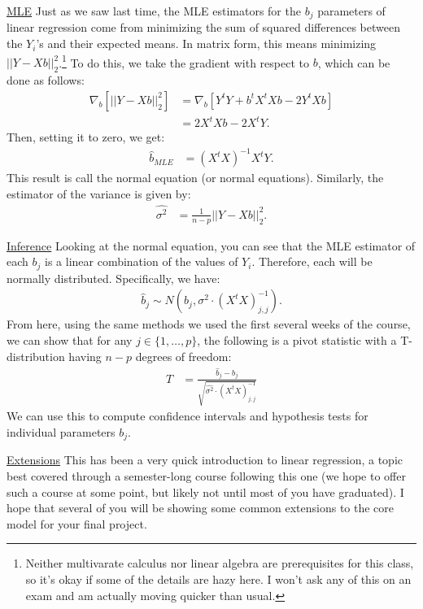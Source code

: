 \documentclass{tufte-handout}
\begin{document}
\vspace*{12pt}

\noindent
\underline{MLE}
Just as we saw last time, the MLE estimators for the $b_j$ parameters of 
linear regression come from minimizing the sum of squared differences between
the $Y_i$'s and their expected means. In matrix form, this means minimizing
$|| Y - X b ||_2^2$.\footnote{
  Neither multivarate calculus nor linear algebra are prerequisites for this
  class, so it's okay if some of the details are hazy here. I won't ask any
  of this on an exam and am actually moving quicker than usual.
}
To do this, we take the gradient with respect to $b$,
which can be done as follows:
\begin{align*}
\nabla_b \left[ || Y - X b ||_2^2  \right] &= \nabla_b \left[ Y^t Y + b^t X^t X b - 2 Y^t X b \right] \\
&= 2 X^t X b - 2 X^t Y.
\end{align*}
Then, setting it to zero, we get:
\begin{align*}
\widehat{b}_{MLE} &= (X^t X)^{-1} X^t Y.
\end{align*}
This result is call the normal equation (or normal equations). Similarly,
the estimator of the variance is given by:
\begin{align*}
\widehat{\sigma^2} &= \frac{1}{n-p} || Y - X b ||_2^2.
\end{align*}

\newpage

\noindent
\underline{Inference}
Looking at the normal equation, you can see that the MLE estimator of each
$b_j$ is a linear combination of the values of $Y_i$. Therefore, each will
be normally distributed. Specifically, we have:
\begin{align*}
\widehat{b}_j \sim N(b_j, \sigma^2 \cdot (X^t X)^{-1}_{j,j}).
\end{align*}
From here, using the same methods we used the first several weeks of the 
course, we can show that for any $j \in \{1, \ldots, p\}$, the following
is a pivot statistic with a T-distribution having $n - p$ degrees of freedom:
\begin{align*}
T &= \frac{\widehat{b}_j - b_j}{\sqrt{\widehat{\sigma^2} \cdot (X^t X)^{-1}_{j,j}}}
\end{align*}
We can use this to compute confidence intervals and hypothesis tests for 
individual parameters $b_j$.

\vspace*{12pt}

\noindent
\underline{Extensions}
This has been a very quick introduction to linear regression, a topic best
covered through a semester-long course following this one (we hope to offer
such a course at some point, but likely not until most of you have
graduated). I hope that several of you will be showing some common
extensions to the core model for your final project.
\end{document}

